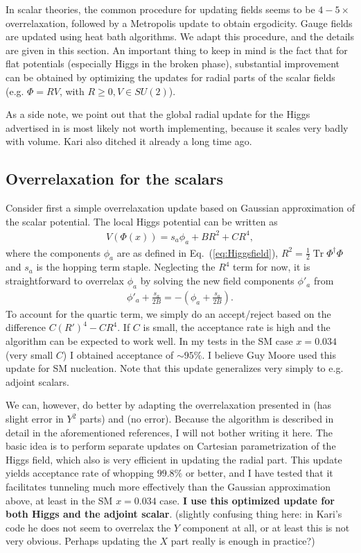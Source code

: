 \documentclass[11pt,a4paper]{article}
\newcommand\Tr{\operatorname{Tr}}
\newcommand\lauri[1]{{\color{myorange}#1}}
\begin{document}
In scalar theories, the common procedure for updating fields seems to be $4-5 \times $overrelaxation, followed by a Metropolis update to obtain ergodicity. Gauge fields are updated using heat bath algorithms. We adapt this procedure, and the details are given in this section. An important thing to keep in mind is the fact that for flat potentials (especially Higgs in the broken phase), substantial improvement can be obtained by optimizing the updates for radial parts of the scalar fields (e.g. $\Phi = R V$, with $R \geq 0, V \in SU(2)$). 

As a side note, we point out that the global radial update for the Higgs advertised in \cite{Kajantie:1995kf} is most likely not worth implementing, because it scales very badly with volume. \lauri{Kari also ditched it already a long time ago.}

\subsection{Overrelaxation for the scalars}

Consider first a simple overrelaxation update based on Gaussian approximation of the scalar potential. The local Higgs potential can be written as 
\begin{align}
V(\Phi(x)) = s_a \phi_a + B R^2 + C R^4,
\end{align}
where the components $\phi_a$ are as defined in Eq.~(\ref{eq:Higgsfield}), $R^2 = \frac12 \Tr\Phi^\dagger\Phi$ and $s_a$ is the hopping term staple. Neglecting the $R^4$ term for now, it is straightforward to overrelax $\phi_a$ by solving the new field components $\phi'_a$ from
\begin{align}
\phi'_a + \frac{s_a}{2B} = -(\phi_a + \frac{s_a}{2B}).
\end{align}
To account for the quartic term, we simply do an accept/reject based on the difference $C (R')^4 - C R^4$. If $C$ is small, the acceptance rate is high and the algorithm can be expected to work well. In my tests in the SM case $x=0.034$ (very small $C$) I obtained acceptance of $\sim 95\%$. \lauri{I believe Guy Moore used this update for SM nucleation.} Note that this update generalizes very simply to e.g. adjoint scalars.

We can, however, do better by adapting the overrelaxation presented in \cite{Kajantie:1995kf} (has slight error in $Y^2$ parts) and \cite{Laine:1998qk} (no error). Because the algorithm is described in detail in the aforementioned references, I will not bother writing it here. The basic idea is to perform separate updates on Cartesian parametrization of the Higgs field, which also is very efficient in updating the radial part. This update yields acceptance rate of whopping $99.8\%$ or better, and I have tested that it facilitates tunneling much more effectively than the Gaussian approximation above, at least in the SM $x = 0.034$ case. \textbf{I use this optimized update for both Higgs and the adjoint scalar}. \lauri{(slightly confusing thing here: in Kari's code he does not seem to overrelax the $Y$ component at all, or at least this is not very obvious. Perhaps updating the $X$ part really is enough in practice?)}
\end{document}

